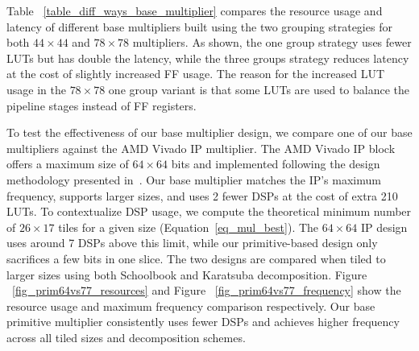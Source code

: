 Table ~\ref{table_diff_ways_base_multiplier} compares the resource usage and latency of different base multipliers built using the two grouping strategies for both $44\times44$ and $78\times78$ multipliers.
As shown, the one group strategy uses fewer LUTs but has double the latency, while the three groups strategy reduces latency at the cost of slightly increased FF usage.
The reason for the increased LUT usage in the $78\times78$ one group variant is that some LUTs are used to balance the pipeline stages instead of FF registers. 

\begin{table}
\centering
\caption{Comparison of different ways to build base multipliers}
\label{table_diff_ways_base_multiplier}
\end{table}






To test the effectiveness of our base multiplier design, we compare one of our base multipliers against the AMD Vivado IP multiplier.
The AMD Vivado IP block offers a maximum size of $64\times64$ bits and implemented following the design methodology presented in~\cite{xilinxincIPMultiplier2015}.
Our base multiplier matches the IP's maximum frequency, supports larger sizes, and uses 2 fewer DSPs at the cost of extra 210 LUTs.
To contextualize DSP usage, we compute the theoretical minimum number of $26\times17$ tiles for a given size (Equation~\ref{eq_mul_best}).
The $64\times64$ IP design uses around 7 DSPs above this limit, while our primitive-based design only sacrifices a few bits in one slice.
The two designs are compared when tiled to larger sizes using both Schoolbook and Karatsuba decomposition.
Figure ~\ref{fig_prim64vs77_resources} and Figure ~\ref{fig_prim64vs77_frequency} show the resource usage and maximum frequency comparison respectively.
Our base primitive multiplier consistently uses fewer DSPs and achieves higher frequency across all tiled sizes and decomposition schemes.


